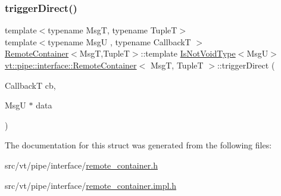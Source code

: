 \mbox{\label{structvt_1_1pipe_1_1interface_1_1_remote_container_a50eb531253f7ef5a31fcf43861c4b39a}} 
\subsubsection{\texorpdfstring{trigger\+Direct()}{triggerDirect()}\hspace{0.1cm}{\footnotesize\ttfamily [2/2]}}
{\footnotesize\ttfamily template$<$typename MsgT, typename TupleT$>$ \\
template$<$typename MsgU , typename CallbackT $>$ \\
\hyperlink{structvt_1_1pipe_1_1interface_1_1_remote_container}{Remote\+Container}$<$MsgT,TupleT$>$\+::template \hyperlink{structvt_1_1pipe_1_1interface_1_1_remote_container_a1dc69f6cfa1318c856a412940e3dbb50}{Is\+Not\+Void\+Type}$<$MsgU$>$ \hyperlink{structvt_1_1pipe_1_1interface_1_1_remote_container}{vt\+::pipe\+::interface\+::\+Remote\+Container}$<$ MsgT, TupleT $>$\+::trigger\+Direct (\begin{DoxyParamCaption}\item[{CallbackT}]{cb,  }\item[{MsgU $\ast$}]{data }\end{DoxyParamCaption})}



The documentation for this struct was generated from the following files\+:\begin{DoxyCompactItemize}
\item 
src/vt/pipe/interface/\hyperlink{remote__container_8h}{remote\+\_\+container.\+h}\item 
src/vt/pipe/interface/\hyperlink{remote__container_8impl_8h}{remote\+\_\+container.\+impl.\+h}\end{DoxyCompactItemize}
